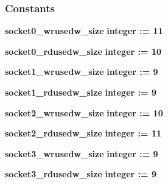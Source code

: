\subsubsection*{Constants}
 \begin{DoxyCompactItemize}
\item 
{\bf socket0\+\_\+wrusedw\+\_\+size} {\bfseries \textcolor{comment}{integer}\textcolor{vhdlchar}{ }\textcolor{vhdlchar}{ }\textcolor{vhdlchar}{\+:}\textcolor{vhdlchar}{=}\textcolor{vhdlchar}{ }\textcolor{vhdlchar}{ } \textcolor{vhdldigit}{11} \textcolor{vhdlchar}{ }} 
\item 
{\bf socket0\+\_\+rdusedw\+\_\+size} {\bfseries \textcolor{comment}{integer}\textcolor{vhdlchar}{ }\textcolor{vhdlchar}{ }\textcolor{vhdlchar}{\+:}\textcolor{vhdlchar}{=}\textcolor{vhdlchar}{ }\textcolor{vhdlchar}{ } \textcolor{vhdldigit}{10} \textcolor{vhdlchar}{ }} 
\item 
{\bf socket1\+\_\+wrusedw\+\_\+size} {\bfseries \textcolor{comment}{integer}\textcolor{vhdlchar}{ }\textcolor{vhdlchar}{ }\textcolor{vhdlchar}{\+:}\textcolor{vhdlchar}{=}\textcolor{vhdlchar}{ }\textcolor{vhdlchar}{ } \textcolor{vhdldigit}{9} \textcolor{vhdlchar}{ }} 
\item 
{\bf socket1\+\_\+rdusedw\+\_\+size} {\bfseries \textcolor{comment}{integer}\textcolor{vhdlchar}{ }\textcolor{vhdlchar}{ }\textcolor{vhdlchar}{\+:}\textcolor{vhdlchar}{=}\textcolor{vhdlchar}{ }\textcolor{vhdlchar}{ } \textcolor{vhdldigit}{9} \textcolor{vhdlchar}{ }} 
\item 
{\bf socket2\+\_\+wrusedw\+\_\+size} {\bfseries \textcolor{comment}{integer}\textcolor{vhdlchar}{ }\textcolor{vhdlchar}{ }\textcolor{vhdlchar}{\+:}\textcolor{vhdlchar}{=}\textcolor{vhdlchar}{ }\textcolor{vhdlchar}{ } \textcolor{vhdldigit}{10} \textcolor{vhdlchar}{ }} 
\item 
{\bf socket2\+\_\+rdusedw\+\_\+size} {\bfseries \textcolor{comment}{integer}\textcolor{vhdlchar}{ }\textcolor{vhdlchar}{ }\textcolor{vhdlchar}{\+:}\textcolor{vhdlchar}{=}\textcolor{vhdlchar}{ }\textcolor{vhdlchar}{ } \textcolor{vhdldigit}{11} \textcolor{vhdlchar}{ }} 
\item 
{\bf socket3\+\_\+wrusedw\+\_\+size} {\bfseries \textcolor{comment}{integer}\textcolor{vhdlchar}{ }\textcolor{vhdlchar}{ }\textcolor{vhdlchar}{\+:}\textcolor{vhdlchar}{=}\textcolor{vhdlchar}{ }\textcolor{vhdlchar}{ } \textcolor{vhdldigit}{9} \textcolor{vhdlchar}{ }} 
\item 
{\bf socket3\+\_\+rdusedw\+\_\+size} {\bfseries \textcolor{comment}{integer}\textcolor{vhdlchar}{ }\textcolor{vhdlchar}{ }\textcolor{vhdlchar}{\+:}\textcolor{vhdlchar}{=}\textcolor{vhdlchar}{ }\textcolor{vhdlchar}{ } \textcolor{vhdldigit}{9} \textcolor{vhdlchar}{ }} 
\end{DoxyCompactItemize}
